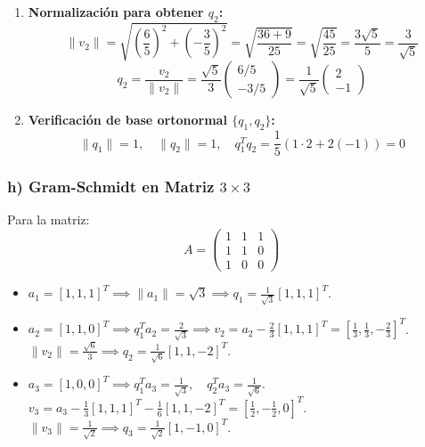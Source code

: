\documentclass[11pt,a4paper]{article}
\theoremstyle{definition}
\theoremstyle{remark}
\begin{document}
\begin{enumerate}[leftmargin=*]
    \begin{equation}
        q_1^T v_2 = \frac{1}{\sqrt{5}} \left[ 1 \left(\frac{6}{5}\right) + 2 \left(-\frac{3}{5}\right) \right] = \frac{1}{\sqrt{5}} \left( \frac{6}{5} - \frac{6}{5} \right) = 0 \quad (\text{Q.E.D.})
    \end{equation}
    \item \textbf{Normalización para obtener $q_2$:}
    \begin{equation}
        \|v_2\| = \sqrt{\left(\frac{6}{5}\right)^2 + \left(-\frac{3}{5}\right)^2} = \sqrt{\frac{36+9}{25}} = \sqrt{\frac{45}{25}} = \frac{3\sqrt{5}}{5} = \frac{3}{\sqrt{5}}
    \end{equation}
    \begin{equation}
        q_2 = \frac{v_2}{\|v_2\|} = \frac{\sqrt{5}}{3} \begin{pmatrix} 6/5 \\ -3/5 \end{pmatrix} = \frac{1}{\sqrt{5}} \begin{pmatrix} 2 \\ -1 \end{pmatrix}
    \end{equation}
    \item \textbf{Verificación de base ortonormal $\{q_1, q_2\}$:}
    \begin{equation}
        \|q_1\| = 1, \quad \|q_2\| = 1, \quad q_1^T q_2 = \frac{1}{5} (1\cdot 2 + 2(-1)) = 0
    \end{equation}
\end{enumerate}

\subsubsection{h) Gram-Schmidt en Matriz $3 \times 3$}
Para la matriz:
\begin{equation}
    A = \begin{pmatrix}
        1 & 1 & 1 \\
        1 & 1 & 0 \\
        1 & 0 & 0
    \end{pmatrix}
\end{equation}
\begin{itemize}[leftmargin=*]
    \item $a_1 = [1, 1, 1]^T \implies \|a_1\| = \sqrt{3} \implies q_1 = \frac{1}{\sqrt{3}} [1, 1, 1]^T$.
    \item $a_2 = [1, 1, 0]^T \implies q_1^T a_2 = \frac{2}{\sqrt{3}} \implies v_2 = a_2 - \frac{2}{3}[1, 1, 1]^T = \left[\frac{1}{3}, \frac{1}{3}, -\frac{2}{3}\right]^T$. \\
    $\|v_2\| = \frac{\sqrt{6}}{3} \implies q_2 = \frac{1}{\sqrt{6}} [1, 1, -2]^T$.
    \item $a_3 = [1, 0, 0]^T \implies q_1^T a_3 = \frac{1}{\sqrt{3}}, \quad q_2^T a_3 = \frac{1}{\sqrt{6}}$. \\
    $v_3 = a_3 - \frac{1}{3}[1, 1, 1]^T - \frac{1}{6}[1, 1, -2]^T = \left[\frac{1}{2}, -\frac{1}{2}, 0\right]^T$. \\
    $\|v_3\| = \frac{1}{\sqrt{2}} \implies q_3 = \frac{1}{\sqrt{2}} [1, -1, 0]^T$.
\end{itemize}
\end{document}
